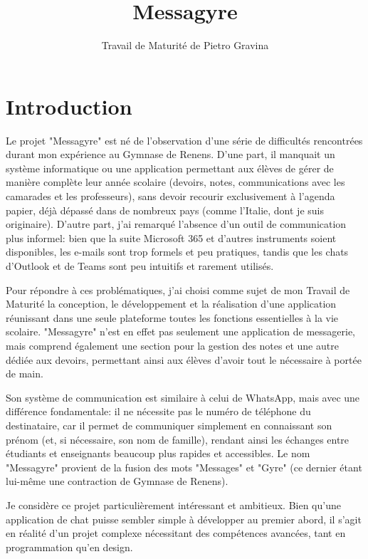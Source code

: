 \documentclass[12pt]{report}
\title{Messagyre}
\author{Travail de Maturité de Pietro Gravina}
\begin{document}
	
	\maketitle
	
	\renewcommand{\contentsname}{Table des matières}
	\tableofcontents
	
	\chapter{Introduction}
	
	Le projet "Messagyre" est né de l’observation d’une série de difficultés rencontrées durant mon expérience au Gymnase de Renens. D’une part, il manquait un système informatique ou une application permettant aux élèves de gérer de manière complète leur année scolaire (devoirs, notes, communications avec les camarades et les professeurs), sans devoir recourir exclusivement à l’agenda papier, déjà dépassé dans de nombreux pays (comme l’Italie, dont je suis originaire). D’autre part, j’ai remarqué l’absence d’un outil de communication plus informel: bien que la suite Microsoft 365 et d’autres instruments soient disponibles, les e-mails sont trop formels et peu pratiques, tandis que les chats d’Outlook et de Teams\supercite{teams} sont peu intuitifs et rarement utilisés.
	
	Pour répondre à ces problématiques, j’ai choisi comme sujet de mon Travail de Maturité la conception, le développement et la réalisation d’une application réunissant dans une seule plateforme toutes les fonctions essentielles à la vie scolaire. "Messagyre" n’est en effet pas seulement une application de messagerie, mais comprend également une section pour la gestion des notes et une autre dédiée aux devoirs, permettant ainsi aux élèves d’avoir tout le nécessaire à portée de main.
	
	Son système de communication est similaire à celui de WhatsApp\supercite{whatsapp}, mais avec une différence fondamentale: il ne nécessite pas le numéro de téléphone du destinataire, car il permet de communiquer simplement en connaissant son prénom (et, si nécessaire, son nom de famille), rendant ainsi les échanges entre étudiants et enseignants beaucoup plus rapides et accessibles. Le nom "Messagyre" provient de la fusion des mots "Messages" et "Gyre" (ce dernier étant lui-même une contraction de Gymnase de Renens).
	
	Je considère ce projet particulièrement intéressant et ambitieux. Bien qu’une application de chat puisse sembler simple à développer au premier abord, il s’agit en réalité d’un projet complexe nécessitant des compétences avancées, tant en programmation qu’en design.
	
\end{document}
